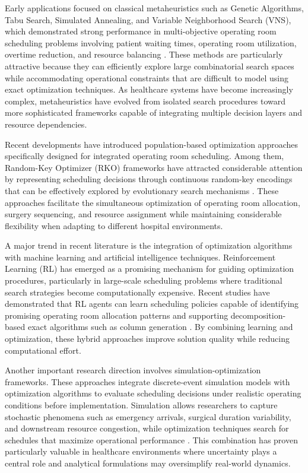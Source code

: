 \documentclass[sn-mathphys-num]{sn-jnl}
\begin{document}
    Early applications focused on classical metaheuristics such as Genetic Algorithms, Tabu Search, Simulated Annealing, and Variable Neighborhood Search (VNS), which demonstrated strong performance in multi-objective operating room scheduling problems involving patient waiting times, operating room utilization, overtime reduction, and resource balancing \cite{cardoen2010_review,cardoen2010_seq}. These methods are particularly attractive because they can efficiently explore large combinatorial search spaces while accommodating operational constraints that are difficult to model using exact optimization techniques. As healthcare systems have become increasingly complex, metaheuristics have evolved from isolated search procedures toward more sophisticated frameworks capable of integrating multiple decision layers and resource dependencies.
    
    Recent developments have introduced population-based optimization approaches specifically designed for integrated operating room scheduling. Among them, Random-Key Optimizer (RKO) frameworks have attracted considerable attention by representing scheduling decisions through continuous random-key encodings that can be effectively explored by evolutionary search mechanisms \cite{vieira2025}. These approaches facilitate the simultaneous optimization of operating room allocation, surgery sequencing, and resource assignment while maintaining considerable flexibility when adapting to different hospital environments.
    
    A major trend in recent literature is the integration of optimization algorithms with machine learning and artificial intelligence techniques. Reinforcement Learning (RL) has emerged as a promising mechanism for guiding optimization procedures, particularly in large-scale scheduling problems where traditional search strategies become computationally expensive. Recent studies have demonstrated that RL agents can learn scheduling policies capable of identifying promising operating room allocation patterns and supporting decomposition-based exact algorithms such as column generation \cite{zhao2025}. By combining learning and optimization, these hybrid approaches improve solution quality while reducing computational effort.
    
    Another important research direction involves simulation-optimization frameworks. These approaches integrate discrete-event simulation models with optimization algorithms to evaluate scheduling decisions under realistic operating conditions before implementation. Simulation allows researchers to capture stochastic phenomena such as emergency arrivals, surgical duration variability, and downstream resource congestion, while optimization techniques search for schedules that maximize operational performance \cite{xiao2022,frichi2025}. This combination has proven particularly valuable in healthcare environments where uncertainty plays a central role and analytical formulations may oversimplify real-world dynamics.
    
\end{document}
